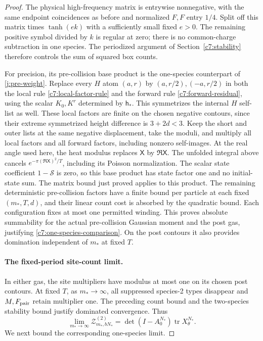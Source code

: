 \begin{proof}
The physical high-frequency matrix is entrywise nonnegative, with the
same endpoint coincidences as before and normalized $F,F$ entry $1/4$.
Split off this matrix times $\tanh(e k)$ with a sufficiently small
fixed $e>0$. The remaining positive symbol divided by $k$ is regular
at zero; there is no common-charge subtraction in one species. The
periodized argument of Section~\ref{c7:stability} therefore controls
the sum of squared box counts.

For precision, its pre-collision base product is the one-species
counterpart of \eqref{j:pre-weight}. Replace every $H$ atom $(a,r)$ by
$(a,r/2),(-a,r/2)$ in both the local rule
\eqref{c7:local-factor-rule} and the forward rule
\eqref{c7:forward-residual}, using the scalar $K_0,K^r$ determined by
$\mathsf h_*$. This symmetrizes the internal $H$ self-list as well.
These local factors are finite on the chosen negative contours, since
their extreme symmetrized height difference is $3+2d<3$.
Keep the short and outer lists at the same negative displacement, take
the moduli, and multiply all local factors and all forward factors,
including nonzero self-images. At the real angle used here, the heat
modulus replaces $\mathsf X$ by $\Re\mathsf X$. The unfolded integral above cancels
$e^{-\pi(\Re\mathsf X)^2/T}$, including its Poisson normalization. The scalar state
coefficient $1-\mathcal S$ is zero, so this base product has state factor
one and no initial-state sum. The matrix bound just proved applies to
this product. The remaining deterministic pre-collision factors have
a finite bound per particle at each fixed $(m_*,T,d)$, and their linear
count cost is absorbed by the quadratic bound. Each configuration fixes
at most one permitted winding. This proves absolute summability for the
actual pre-collision Gaussian moment and the post gas, justifying
\eqref{c7:one-species-comparison}. On the post contours it also provides
domination independent of $m_*$ at fixed $T$.

\paragraph{The fixed-period site-count limit.}
In either gas, the site multipliers have modulus at most one on its
chosen post contours. At fixed $T$, as $m_*\to\infty$, all suppressed
species-2 types disappear and $M,F_{\rm pair}$ retain multiplier one.
The preceding count bound and the two-species stability bound justify
dominated convergence. Thus
\[
 \lim_{m_*\to\infty}\mathcal Z^{(2)}_{m_*,bN_*}
 =\det(I-A_0^{N_*})\operatorname{tr}X_\theta^{N_*}.
\]
We next bound the corresponding one-species limit.


\end{proof}
